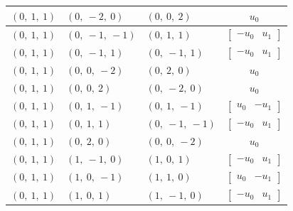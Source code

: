 \documentclass[11pt]{article}
\theoremstyle{definition}
\begin{document}
\begin{longtable}{|l|l|l|c|}
    \hline
    $\left( 0, \  1, \  1\right)$ & $\left( 0, \  -2, \  0\right)$ & $\left( 0, \  0, \  2\right)$ & $u_{0}$ \\
    \hline
    $\left( 0, \  1, \  1\right)$ & $\left( 0, \  -1, \  -1\right)$ & $\left( 0, \  1, \  1\right)$ & $\left[\begin{matrix}- u_{0} & u_{1}\end{matrix}\right]$ \\
    \hline
    $\left( 0, \  1, \  1\right)$ & $\left( 0, \  -1, \  1\right)$ & $\left( 0, \  -1, \  1\right)$ & $\left[\begin{matrix}- u_{0} & u_{1}\end{matrix}\right]$ \\
    \hline
    $\left( 0, \  1, \  1\right)$ & $\left( 0, \  0, \  -2\right)$ & $\left( 0, \  2, \  0\right)$ & $u_{0}$ \\
    \hline
    $\left( 0, \  1, \  1\right)$ & $\left( 0, \  0, \  2\right)$ & $\left( 0, \  -2, \  0\right)$ & $u_{0}$ \\
    \hline
    $\left( 0, \  1, \  1\right)$ & $\left( 0, \  1, \  -1\right)$ & $\left( 0, \  1, \  -1\right)$ & $\left[\begin{matrix}u_{0} & - u_{1}\end{matrix}\right]$ \\
    \hline
    $\left( 0, \  1, \  1\right)$ & $\left( 0, \  1, \  1\right)$ & $\left( 0, \  -1, \  -1\right)$ & $\left[\begin{matrix}- u_{0} & u_{1}\end{matrix}\right]$ \\
    \hline
    $\left( 0, \  1, \  1\right)$ & $\left( 0, \  2, \  0\right)$ & $\left( 0, \  0, \  -2\right)$ & $u_{0}$ \\
    \hline
    $\left( 0, \  1, \  1\right)$ & $\left( 1, \  -1, \  0\right)$ & $\left( 1, \  0, \  1\right)$ & $\left[\begin{matrix}- u_{0} & u_{1}\end{matrix}\right]$ \\
    \hline
    $\left( 0, \  1, \  1\right)$ & $\left( 1, \  0, \  -1\right)$ & $\left( 1, \  1, \  0\right)$ & $\left[\begin{matrix}u_{0} & - u_{1}\end{matrix}\right]$ \\
    \hline
    $\left( 0, \  1, \  1\right)$ & $\left( 1, \  0, \  1\right)$ & $\left( 1, \  -1, \  0\right)$ & $\left[\begin{matrix}- u_{0} & u_{1}\end{matrix}\right]$ \\

\end{longtable}
\end{document}
